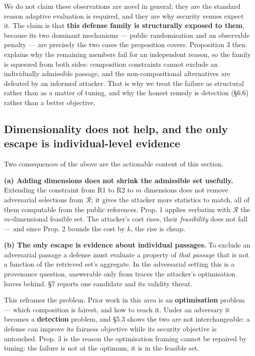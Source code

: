 \documentclass[authoryear,review,3p,times]{elsarticle}
\begin{document}
We do not claim these observations are novel in general; they are the standard reason adaptive evaluation is required, and they are why security venues expect it. The claim is that \textbf{this defense family is structurally exposed to them}, because its two dominant mechanisms --- public randomisation and an observable penalty --- are precisely the two cases the proposition covers. Proposition 3 then explains why the remaining members fail for an independent reason, so the family is squeezed from both sides: composition constraints cannot exclude an individually admissible passage, and the non-compositional alternatives are defeated by an informed attacker. That is why we treat the failure as structural rather than as a matter of tuning, and why the honest remedy is detection (§6.6) rather than a better objective.

\subsection{Dimensionality does not help, and the only escape is individual-level evidence}\label{dimensionality-does-not-help-and-the-only-escape-is-individual-level-evidence}

Two consequences of the above are the actionable content of this section.

\textbf{(a) Adding dimensions does not shrink the admissible set usefully.} Extending the constraint from R1 to R2 to \(m\) dimensions does not remove adversarial selections from \(\mathcal{R}\); it gives the attacker more statistics to match, all of them computable from the public references. Prop. 1 applies verbatim with \(\mathcal{R}\) the \(m\)-dimensional feasible set. The attacker's cost rises, their \emph{feasibility} does not fall --- and since Prop. 2 bounds the cost by \(k\), the rise is cheap.

\textbf{(b) The only escape is evidence about individual passages.} To exclude an adversarial passage a defense must evaluate a property of \emph{that passage} that is not a function of the retrieved set's aggregate. In the adversarial setting this is a provenance question, answerable only from traces the attacker's optimisation leaves behind. §7 reports one candidate and its validity threat.

This reframes the problem. Prior work in this area is an \textbf{optimisation} problem --- which composition is fairest, and how to reach it. Under an adversary it becomes a \textbf{detection} problem, and §5.3 shows the two are not interchangeable: a defense can improve its fairness objective while its security objective is untouched. Prop. 3 is the reason the optimisation framing cannot be repaired by tuning: the failure is not at the optimum, it is in the feasible set.
\end{document}
